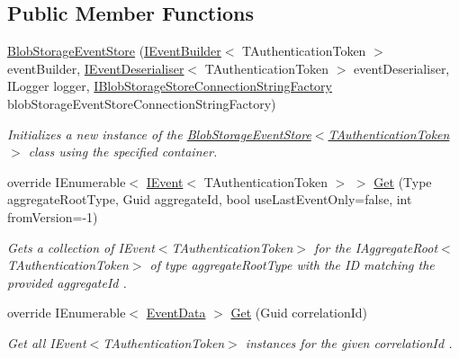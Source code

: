\subsection*{Public Member Functions}
\begin{DoxyCompactItemize}
\item 
\hyperlink{classCqrs_1_1Azure_1_1BlobStorage_1_1Events_1_1BlobStorageEventStore_a04ce4516e7e1d30339d3f04ba54abe54_a04ce4516e7e1d30339d3f04ba54abe54}{Blob\+Storage\+Event\+Store} (\hyperlink{interfaceCqrs_1_1Events_1_1IEventBuilder}{I\+Event\+Builder}$<$ T\+Authentication\+Token $>$ event\+Builder, \hyperlink{interfaceCqrs_1_1Events_1_1IEventDeserialiser}{I\+Event\+Deserialiser}$<$ T\+Authentication\+Token $>$ event\+Deserialiser, I\+Logger logger, \hyperlink{interfaceCqrs_1_1Azure_1_1BlobStorage_1_1IBlobStorageStoreConnectionStringFactory}{I\+Blob\+Storage\+Store\+Connection\+String\+Factory} blob\+Storage\+Event\+Store\+Connection\+String\+Factory)
\begin{DoxyCompactList}\small\item\em Initializes a new instance of the \hyperlink{classCqrs_1_1Azure_1_1BlobStorage_1_1Events_1_1BlobStorageEventStore_a04ce4516e7e1d30339d3f04ba54abe54_a04ce4516e7e1d30339d3f04ba54abe54}{Blob\+Storage\+Event\+Store$<$\+T\+Authentication\+Token$>$} class using the specified container. \end{DoxyCompactList}\item 
override I\+Enumerable$<$ \hyperlink{interfaceCqrs_1_1Events_1_1IEvent}{I\+Event}$<$ T\+Authentication\+Token $>$ $>$ \hyperlink{classCqrs_1_1Azure_1_1BlobStorage_1_1Events_1_1BlobStorageEventStore_ab68b594c54ae5a79e3b8d5db1902752d_ab68b594c54ae5a79e3b8d5db1902752d}{Get} (Type aggregate\+Root\+Type, Guid aggregate\+Id, bool use\+Last\+Event\+Only=false, int from\+Version=-\/1)
\begin{DoxyCompactList}\small\item\em Gets a collection of I\+Event$<$\+T\+Authentication\+Token$>$ for the I\+Aggregate\+Root$<$\+T\+Authentication\+Token$>$ of type {\itshape aggregate\+Root\+Type}  with the ID matching the provided {\itshape aggregate\+Id} . \end{DoxyCompactList}\item 
override I\+Enumerable$<$ \hyperlink{classCqrs_1_1Events_1_1EventData}{Event\+Data} $>$ \hyperlink{classCqrs_1_1Azure_1_1BlobStorage_1_1Events_1_1BlobStorageEventStore_a660c786205693ee34a11e205c6d136ad_a660c786205693ee34a11e205c6d136ad}{Get} (Guid correlation\+Id)
\begin{DoxyCompactList}\small\item\em Get all I\+Event$<$\+T\+Authentication\+Token$>$ instances for the given {\itshape correlation\+Id} . \end{DoxyCompactList}\end{DoxyCompactItemize}
